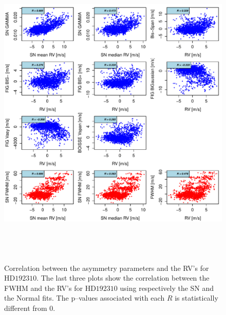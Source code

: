 \documentclass{aa}
\begin{document}
\begin{figure}[htbp]
   \centering
\includegraphics[height = 6in]{HD19231_[4]Comparison_para.pdf} 
   \caption{Correlation between the asymmetry parameters and the RV's for $\text{HD}192310$. The last three plots show the correlation between the FWHM and the RV's for $\text{HD}192310$ using respectively the SN and the Normal fits. The p--values associated with each $R$ is statistically different from $0$.}
   \label{fig:Gliese785:corrPlot}
\end{figure}
\end{document}
